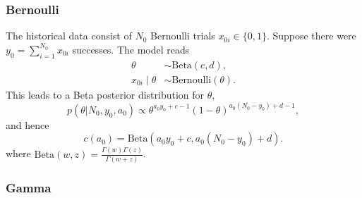 \documentclass[a4paper, notitlepage, 11pt]{article}
\begin{document}
\subsubsection*{Bernoulli}
The historical data consist of $N_0$ Bernoulli trials $x_{0i} \in \{0,1\}$.
Suppose there were $y_0 = \sum_{i=1}^{N_0}x_{0i}$ successes.
The model reads
\begin{align*}
 \theta &\sim \text{Beta}(c, d), \\
 x_{0i} \mid \theta &\sim \text{Bernoulli}(\theta).
\end{align*}
This leads to a Beta posterior distribution for $\theta$,
\begin{equation}
 \label{eq:bernoulli_posterior}
 p(\theta | N_0, y_0, a_0) \propto \theta ^{a_0 y_0 + c - 1} (1-\theta)^{a_0 (N_0 -y_0) + d - 1},
\end{equation}
and hence 
\begin{equation}
 \label{eq:cA0_bernoulli}
 c(a_0) = \text{Beta}(a_0 y_0 + c, a_0 (N_0 -y_0) + d).
\end{equation}
where $\text{Beta}(w, z) = \frac{\Gamma(w)\Gamma(z)}{\Gamma(w + z)}$.


\subsubsection*{Gamma}
\end{document}
